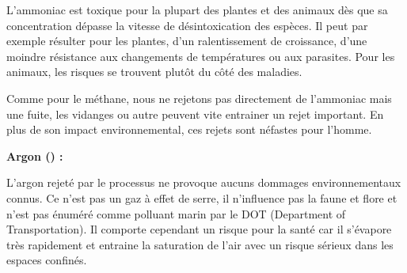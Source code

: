 \documentclass[a4paper, oneside, 12pt]{article}
\begin{document}
L’ammoniac est toxique pour la plupart des plantes et des animaux dès que sa concentration dépasse la vitesse de désintoxication des espèces. Il peut par exemple résulter pour les plantes, d’un ralentissement de croissance, d’une moindre résistance aux changements de températures ou aux parasites. Pour les animaux, les risques se trouvent plutôt du côté des maladies. 

Comme pour le méthane, nous ne rejetons pas directement de l’ammoniac mais une fuite, les vidanges ou autre peuvent vite entrainer un rejet important. En plus de son impact environnemental, ces rejets sont néfastes pour l’homme.  \newline

\textbf{Argon () : }

L’argon rejeté par le processus ne provoque aucuns dommages environnementaux connus. Ce n’est pas un gaz à effet de serre, il n’influence pas la faune et flore et n’est pas énuméré comme polluant marin par le DOT (Department of Transportation). Il comporte cependant un risque pour la santé car il s’évapore très rapidement et entraine la saturation de l’air avec un risque sérieux dans les espaces confinés. \newline
\end{document}
